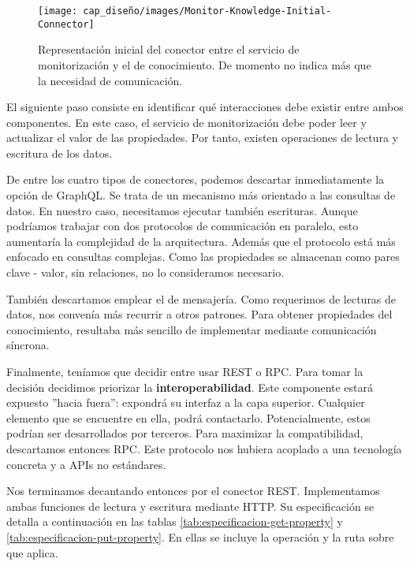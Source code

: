 \begin{wrapfigure}{r}{0.38\linewidth}
  \centering
  \vspace{10pt}
  \texttt{[image: cap\_diseño/images/Monitor-Knowledge-Initial-Connector]}
  \caption{Representación inicial del conector entre el servicio de monitorización y el de conocimiento. De momento no indica más que la necesidad de comunicación.}
  \label{fig:monitor-knowledge-initial}
  \vspace{2pt}
\end{wrapfigure}

El siguiente paso consiste en identificar qué interacciones debe existir entre ambos componentes. En este caso, el servicio de monitorización debe poder leer y actualizar el valor de las propiedades. Por tanto, existen operaciones de lectura y escritura de los datos.

De entre los cuatro tipos de conectores, podemos descartar inmediatamente la opción de GraphQL. Se trata de un mecanismo más orientado a las consultas de datos. En nuestro caso, necesitamos ejecutar también escrituras. Aunque podríamos trabajar con dos protocolos de comunicación en paralelo, esto aumentaría la complejidad de la arquitectura. Además que el protocolo está más enfocado en consultas complejas. Como las propiedades se almacenan como pares clave - valor, sin relaciones, no lo consideramos necesario.

También descartamos emplear el  de mensajería. Como requerimos de lecturas de datos, nos convenía más recurrir a otros patrones. Para obtener propiedades del conocimiento, resultaba más sencillo de implementar mediante comunicación síncrona.

Finalmente, teníamos que decidir entre usar REST o RPC. Para tomar la decisión decidimos priorizar la \textbf{interoperabilidad}. Este componente estará expuesto ''hacia fuera'': expondrá su interfaz a la capa superior. Cualquier elemento que se encuentre en ella, podrá contactarlo. Potencialmente, estos podrían ser desarrollados por terceros. Para maximizar la compatibilidad, descartamos entonces RPC. Este protocolo nos hubiera acoplado a una tecnología concreta y a APIs no estándares.

Nos terminamos decantando entonces por el conector REST. Implementamos ambas funciones de lectura y escritura mediante  HTTP. Su especificación se detalla a continuación en las tablas \ref{tab:especificacion-get-property} y \ref{tab:especificacion-put-property}. En ellas se incluye la operación y la ruta sobre que aplica.

